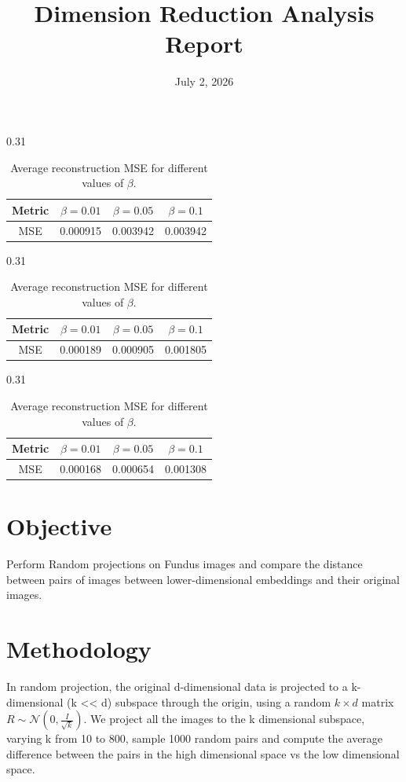 \documentclass[a4paper,11pt]{article}
\begin{document}
\begin{table}[h]
\centering
\small

\begin{subtable}{0.31\linewidth}
\centering
\caption{RAW Reconstruction}
\begin{tabular}{cccc}
\toprule
Metric & $\beta=0.01$ & $\beta=0.05$ & $\beta=0.1$ \\
\midrule
MSE & 0.000915 & 0.003942 & 0.003942 \\
\bottomrule
\end{tabular}
\end{subtable}
\hfill

\begin{subtable}{0.31\linewidth}
\centering
\caption{COV Reconstruction}
\begin{tabular}{cccc}
\toprule
Metric & $\beta=0.01$ & $\beta=0.05$ & $\beta=0.1$ \\
\midrule
MSE & 0.000189 & 0.000905 & 0.001805 \\
\bottomrule
\end{tabular}
\end{subtable}
\hfill

\begin{subtable}{0.31\linewidth}
\centering
\caption{COR Reconstruction}
\begin{tabular}{cccc}
\toprule
Metric & $\beta=0.01$ & $\beta=0.05$ & $\beta=0.1$ \\
\midrule
MSE & 0.000168 & 0.000654 & 0.001308 \\
\bottomrule
\end{tabular}
\end{subtable}

\caption{Average reconstruction MSE for different values of $\beta$.}
\label{tab:reconstruction_mse}
\end{table}

\clearpage
\title{\textbf{Dimension Reduction Analysis Report}}
\date{July 2, 2026}
\section{Objective}
Perform Random projections on Fundus images and compare the distance between pairs of images between lower-dimensional embeddings and their original images. 
\section{Methodology}
In random projection, the original d-dimensional data is projected to a k-dimensional (k << d)  subspace through the origin, using a random $k\times d$ matrix $R \sim \mathcal{N}(0,\frac{I}{\sqrt{k}})$. We project all the images to the k dimensional subspace, varying k from 10 to 800, sample 1000 random pairs and compute the average difference between the pairs in the high dimensional space vs the low dimensional space.
\end{document}
